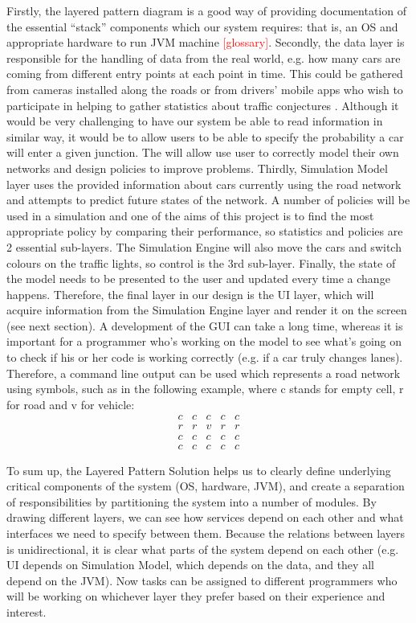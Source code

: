 \documentclass{article}
\begin{document}
Firstly, the layered pattern diagram is a good way of providing documentation of the essential “stack” components which our system requires: that is, an OS and appropriate hardware to run JVM machine \textcolor{red}{[glossary]}. Secondly, the data layer is responsible for the handling of data from the real world, e.g. how many cars are coming from different entry points at each point in time. This could be gathered from cameras installed along the roads or from drivers’ mobile apps who wish to participate in helping to gather statistics about traffic conjectures \cite{NCTA}. Although it would be very challenging to have our system be able to read information in similar way, it would be to allow users to be able to specify the probability a car will enter a given junction. The will allow use user to correctly model their own networks and design policies to improve problems. Thirdly, Simulation Model layer uses the provided information about cars currently using the road network and attempts to predict future states of the network. A number of policies will be used in a simulation and one of the aims of this project is to find the most appropriate policy by comparing their performance, so statistics and policies are 2 essential sub-layers. The Simulation Engine will also move the cars and switch colours on the traffic lights, so control is the 3rd sub-layer. Finally, the state of the model needs to be presented to the user and updated every time a change happens. Therefore, the final layer in our design is the UI layer, which will acquire information from the Simulation Engine layer and render it on the screen (see next section). A development of the GUI can take a long time, whereas it is important for a programmer who’s working on the model to see what’s going on to check if his or her code is working correctly (e.g. if a car truly changes lanes). Therefore, a command line output can be used which represents a road network using symbols, such as in the following example, where c stands for empty cell, r for road and v for vehicle: \\

$$
\begin{matrix}
	c & c & c & c & c \\
	r & r & v & r & r \\
	c & c & c & c & c \\
	c & c & c & c & c
\end{matrix}
$$

To sum up, the Layered Pattern Solution helps us to clearly define underlying critical components of the system (OS, hardware, JVM), and create a separation of responsibilities by partitioning the system into a number of modules. By drawing different layers, we can see how services depend on each other and what interfaces we need to specify between them. Because the relations between layers is unidirectional, it is clear what parts of the system depend on each other (e.g. UI depends on Simulation Model, which depends on the data, and they all depend on the JVM). Now tasks can be assigned to different programmers who will be working on whichever layer they prefer based on their experience and interest. 
\end{document}
